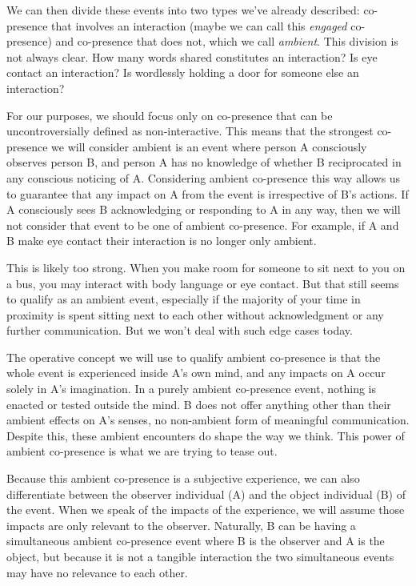 \documentclass[12pt]{article}
\begin{document}
We can then divide these events into two types we've already described: co-presence that involves an interaction (maybe we can call this \textit{engaged} co-presence) and co-presence that does not, which we call \textit{ambient}. This division is not always clear. How many words shared constitutes an interaction? Is eye contact an interaction? Is wordlessly holding a door for someone else an interaction?

For our purposes, we should focus only on co-presence that can be uncontroversially defined as non-interactive. This means that the strongest co-presence we will consider ambient is an event where person A consciously observes person B, and person A has no knowledge of whether B reciprocated in any conscious noticing of A. Considering ambient co-presence this way allows us to guarantee that any impact on A from the event is irrespective of B's actions. If A consciously sees B acknowledging or responding to A in any way, then we will not consider that event to be one of ambient co-presence. For example, if A and B make eye contact their interaction is no longer only ambient.

This is likely too strong. When you make room for someone to sit next to you on a bus, you may interact with body language or eye contact. But that still seems to qualify as an ambient event, especially if the majority of your time in proximity is spent sitting next to each other without acknowledgment or any further communication. But we won't deal with such edge cases today. 

The operative concept we will use to qualify ambient co-presence is that the whole event is experienced inside A's own mind, and any impacts on A occur solely in A's imagination. In a purely ambient co-presence event, nothing is enacted or tested outside the mind. B does not offer anything other than their ambient effects on A's senses, no non-ambient form of meaningful communication. Despite this, these ambient encounters do shape the way we think. This power of ambient co-presence is what we are trying to tease out.

Because this ambient co-presence is a subjective experience, we can also differentiate between the observer individual (A) and the object individual (B) of the event. When we speak of the impacts of the experience, we will assume those impacts are only relevant to the observer. Naturally, B can be having a simultaneous ambient co-presence event where B is the observer and A is the object, but because it is not a tangible interaction the two simultaneous events may have no relevance to each other.
\end{document}
